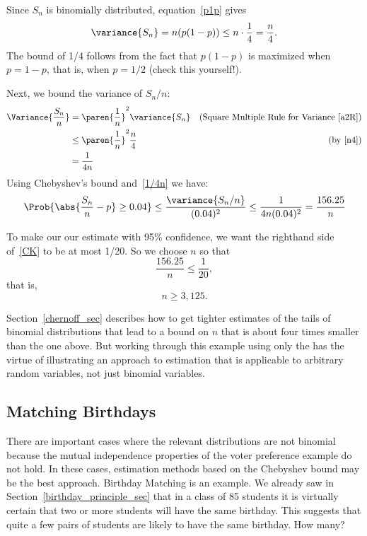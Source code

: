 Since $S_n$ is binomially distributed, equation~\eqref{p1p} gives
\[
\variance{S_n}  = n(p(1-p)) \leq n \cdot \frac{1}{4} = \frac{n}{4}.\label{n4}
\]
The bound of 1/4 follows from the fact that $p(1-p)$ is maximized when $p
= 1-p$, that is, when $p=1/2$ (check this yourself!).

Next, we bound the variance of $S_n/n$:
\begin{align}
\Variance{\frac{S_n}{n}}
       & = \paren{\frac{1}{n}}^2 \variance{S_n}
                     & \text{(Square Multiple Rule for Variance~\eqref{a2R})}\notag\\
       & \leq \paren{\frac{1}{n}}^2 \frac{n}{4} & \text{(by~\eqref{n4})}\notag\\
       & = \frac{1}{4n}\label{1/4n}
\end{align}
Using Chebyshev's bound and~\eqref{1/4n} we have:
\begin{equation}\label{CK}
\Prob{\abs{\frac{S_n}{n} - p} \geq 0.04}
    \leq \frac{\variance{S_n/n}}{(0.04)^2}
       \leq \frac{1}{4n(0.04)^2} = \frac{156.25}{n}
\end{equation}

To make our our estimate with 95\% confidence, we want the righthand
side of~\eqref{CK} to be at most 1/20.  So we choose $n$ so that
\[
\frac{156.25}{n} \leq \frac{1}{20},
\]
that is,
\[
n \geq 3,125.
\]

Section~\ref{chernoff_sec} describes how to get tighter estimates of
the tails of binomial distributions that lead to a bound on $n$ that
is about four times smaller than the one above.  But working through
this example using only the  has the virtue of
illustrating an approach to estimation that is applicable to arbitrary
random variables, not just binomial variables.
\iffalse , and it did lead to a feasible, though larger than
necessary, sample size.\fi

\subsection{Matching Birthdays}\label{bday_deviation_subsec}

There are important cases where the relevant distributions are not
binomial because the mutual independence properties of the voter
preference example do not hold.  In these cases, estimation methods
based on the Chebyshev bound may be the best approach.  Birthday
Matching is an example.  We already saw in
Section~\ref{birthday_principle_sec} that in a class of 85 students it
is virtually certain that two or more students will have the same
birthday.  This suggests that quite a few pairs of students are likely
to have the same birthday.  How many?

